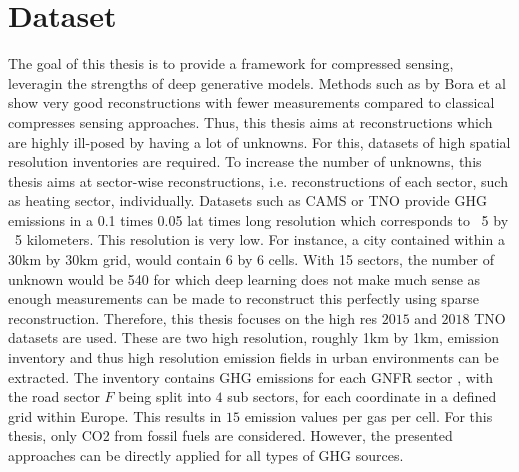 
\chapter{Dataset}\label{chapter:dataset}

The goal of this thesis is to provide a framework for compressed sensing, leveragin the strengths of deep generative models.
Methods such as by Bora et al \parencite{CSUsingAI} show very good reconstructions with fewer measurements compared to classical compresses sensing approaches.
Thus, this thesis aims at reconstructions which are highly ill-posed by having a lot of unknowns.
For this, datasets of high spatial resolution inventories are required.
To increase the number of unknowns, this thesis aims at sector-wise reconstructions, i.e. reconstructions of each sector, such as heating sector, individually.
Datasets such as CAMS \parencite{CAMS} or TNO \parencite{TNO_LowRes}  provide GHG emissions in a 0.1 times 0.05 lat times long resolution which corresponds to ~5 by ~5 kilometers.
This resolution is very low.
For instance, a city contained within a 30km by 30km grid, would contain 6 by 6 cells.
With 15 sectors, the number of unknown would be 540 for which deep learning does not make much sense as enough measurements can be made to reconstruct this perfectly using sparse reconstruction.
Therefore, this thesis focuses on the high res $2015$ \parencite{TNO_HighRes15} and $2018$ \parencite{TNO_HighRes18} TNO datasets are used.
These are two high resolution, roughly 1km by 1km, emission inventory and thus high resolution emission fields in urban environments can be extracted.
The inventory contains GHG emissions for each GNFR sector \parencite{GNFR_Sectors}, with the road sector $F$ being split into $4$ sub sectors, for each coordinate in a defined grid within Europe.
This results in $15$ emission values per gas per cell.
For this thesis, only CO2 from fossil fuels are considered.
However, the presented approaches can be directly applied for all types of GHG sources.

